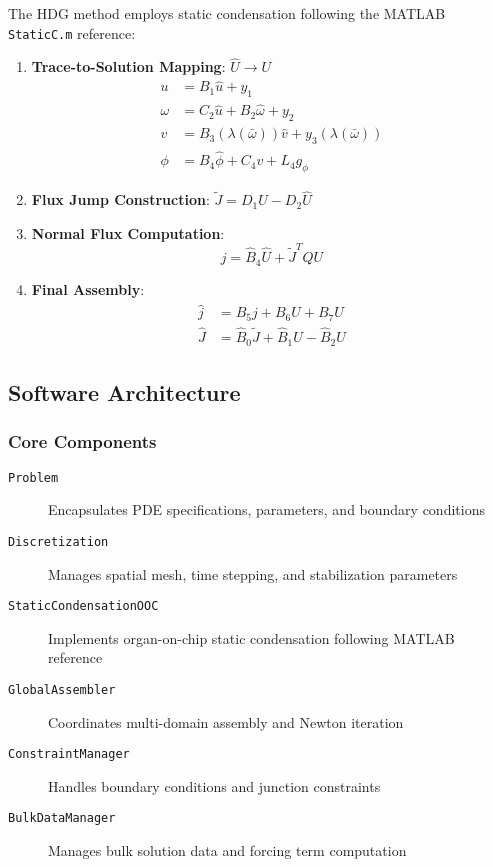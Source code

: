 The HDG method employs static condensation following the MATLAB \texttt{StaticC.m} reference:

\begin{enumerate}
    \item \textbf{Trace-to-Solution Mapping}: $\hat{U} \rightarrow U$
    \begin{align}
        u &= B_1 \hat{u} + y_1 \\
        \omega &= C_2 \hat{u} + B_2 \hat{\omega} + y_2 \\
        v &= B_3(\lambda(\bar{\omega})) \hat{v} + y_3(\lambda(\bar{\omega})) \\
        \phi &= B_4 \hat{\phi} + C_4 v + L_4 g_\phi
    \end{align}
    
    \item \textbf{Flux Jump Construction}: $\tilde{J} = D_1 U - D_2 \hat{U}$
    
    \item \textbf{Normal Flux Computation}: 
    \begin{equation}
        j = \hat{B}_4 \hat{U} + \tilde{J}^T Q U
    \end{equation}
    
    \item \textbf{Final Assembly}:
    \begin{align}
        \hat{j} &= B_5 j + B_6 U + B_7 \hat{U} \\
        \hat{J} &= \hat{B}_0 \tilde{J} + \hat{B}_1 U - \hat{B}_2 \hat{U}
    \end{align}
\end{enumerate}

\subsection{Software Architecture}

\subsubsection{Core Components}

\begin{description}
    \item[\texttt{Problem}] Encapsulates PDE specifications, parameters, and boundary conditions
    \item[\texttt{Discretization}] Manages spatial mesh, time stepping, and stabilization parameters
    \item[\texttt{StaticCondensationOOC}] Implements organ-on-chip static condensation following MATLAB reference
    \item[\texttt{GlobalAssembler}] Coordinates multi-domain assembly and Newton iteration
    \item[\texttt{ConstraintManager}] Handles boundary conditions and junction constraints
    \item[\texttt{BulkDataManager}] Manages bulk solution data and forcing term computation
\end{description}

